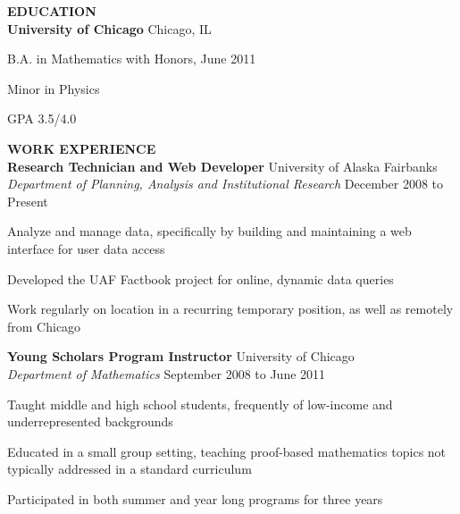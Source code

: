 \documentclass{article}
\begin{document}
\fancyfoot{}

\begin{flushleft}

{\bf EDUCATION}\\
\hspace{20pt}
{\bf University of Chicago} Chicago, IL
\vspace{-6pt}
\begin{list}{}{\leftmargin=50pt}\setlength{\itemsep}{-2pt}
\item B.A. in Mathematics with Honors, June 2011
\item Minor in Physics
\item GPA 3.5/4.0
\end{list}

{\bf WORK EXPERIENCE}\\
\hspace{20pt}
{\bf Research Technician and Web Developer} \hfill University of Alaska Fairbanks\\
\hspace{20pt}
{\it Department of Planning, Analysis and Institutional Research} \hfill December 2008 to Present\\
\vspace{-6pt}
\begin{list}{}{\leftmargin=50pt}\setlength{\itemsep}{-2pt}
\item Analyze and manage data, specifically by building and maintaining a web interface for user data access
\item Developed the UAF Factbook project for online, dynamic data queries
\item Work regularly on location in a recurring temporary position, as well as remotely from Chicago
\end{list}
 
\hspace{20pt}
{\bf Young Scholars Program Instructor} \hfill University of Chicago\\
\hspace{20pt}
{\it Department of Mathematics} \hfill September 2008 to June 2011\\
\vspace{-6pt}
\begin{list}{}{\leftmargin=50pt}\setlength{\itemsep}{-2pt}
\item Taught middle and high school students, frequently of low-income and underrepresented backgrounds
\item Educated in a small group setting, teaching proof-based mathematics topics not typically addressed in a standard curriculum
\item Participated in both summer and year long programs for three years
\end{list}


\end{flushleft}
\end{document}
